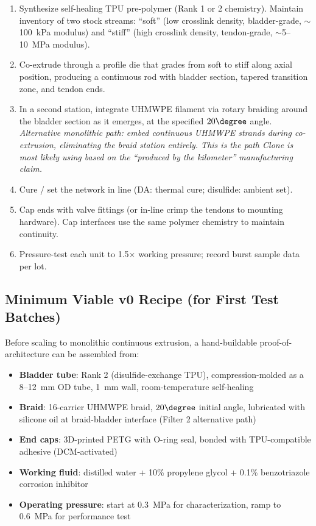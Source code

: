 \documentclass[11pt, a4paper]{article}
\begin{document}
\begin{enumerate}[nosep]
  \item Synthesize self-healing TPU pre-polymer (Rank 1 or 2
        chemistry). Maintain inventory of two stock streams:
        ``soft'' (low crosslink density, bladder-grade,
        $\sim$100~kPa modulus) and ``stiff'' (high crosslink
        density, tendon-grade, $\sim$5--10~MPa modulus).
  \item Co-extrude through a profile die that grades from soft
        to stiff along axial position, producing a continuous
        rod with bladder section, tapered transition zone, and
        tendon ends.
  \item In a second station, integrate UHMWPE filament via
        rotary braiding around the bladder section as it
        emerges, at the specified $20\degree$ angle.
        \textit{Alternative monolithic path: embed continuous
        UHMWPE strands during co-extrusion, eliminating the
        braid station entirely. This is the path Clone is most
        likely using based on the ``produced by the kilometer''
        manufacturing claim.}
  \item Cure / set the network in line (DA: thermal cure;
        disulfide: ambient set).
  \item Cap ends with valve fittings (or in-line crimp the
        tendons to mounting hardware). Cap interfaces use the
        same polymer chemistry to maintain continuity.
  \item Pressure-test each unit to 1.5$\times$ working pressure;
        record burst sample data per lot.
\end{enumerate}

\subsection{Minimum Viable v0 Recipe (for First Test Batches)}

Before scaling to monolithic continuous extrusion, a hand-buildable
proof-of-architecture can be assembled from:

\begin{itemize}[nosep]
  \item \textbf{Bladder tube}: Rank 2 (disulfide-exchange TPU),
        compression-molded as a 8--12~mm OD tube, 1~mm wall,
        room-temperature self-healing
  \item \textbf{Braid}: 16-carrier UHMWPE braid, $20\degree$
        initial angle, lubricated with silicone oil at braid-bladder
        interface (Filter 2 alternative path)
  \item \textbf{End caps}: 3D-printed PETG with O-ring seal,
        bonded with TPU-compatible adhesive (DCM-activated)
  \item \textbf{Working fluid}: distilled water + 10\% propylene
        glycol + 0.1\% benzotriazole corrosion inhibitor
  \item \textbf{Operating pressure}: start at 0.3~MPa for
        characterization, ramp to 0.6~MPa for performance test
\end{itemize}
\end{document}
